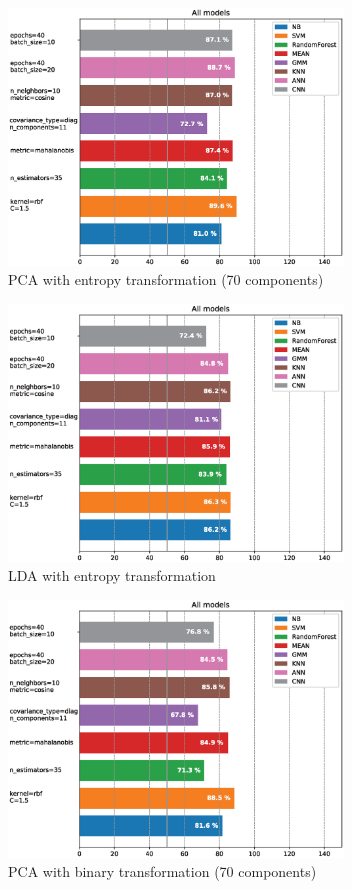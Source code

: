 \documentclass[10pt,journal,compsoc]{IEEEtran}
\begin{document}
\begin{figure}[!h]
	\centering
	\includegraphics[width=3.5in]{./img/all_models_pca_70_entropy.eps}
	\caption{PCA with entropy transformation (70 components)}
	\label{PCAentropy}
\end{figure}
\begin{figure}[!h]
	\centering
	\includegraphics[width=3.5in]{./img/all_models_lda_entropy.eps}
	\caption{LDA with entropy transformation}
	\label{LDAentropy}
\end{figure}
\begin{figure}[!h]
	\centering
	\includegraphics[width=3.5in]{./img/all_models_pca_70_binary.eps}
	\caption{PCA with binary transformation (70 components)}
	\label{PCAbin}
\end{figure}
\end{document}
